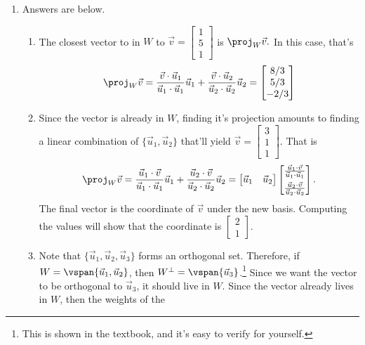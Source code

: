 \begin{enumerate}
		\item Answers are below.
			\begin{enumerate}
				\item The closest vector to in \(W\) to \(\vec{v} = \begin{bmatrix}1 \\ 5 \\ 1\end{bmatrix}\) is \(\proj_W \vec{v}.\)
				In this case, that's 
				\[\proj_W \vec{v}
				  = \frac{\vec{v} \cdot \vec{u}_1}{\vec{u}_1 \cdot \vec{u}_1}\vec{u}_1 
				   + \frac{\vec{v} \cdot \vec{u}_2}{\vec{u}_2 \cdot \vec{u}_2}\vec{u}_2 = \begin{bmatrix}8/3 \\ 5/3 \\ -2/3\end{bmatrix}\]
				\item Since the vector is already in \(W\), finding it's projection amounts to finding a linear combination of \(\{\vec{u}_1, \vec{u}_2\}\)
					that'll yield \(\vec{v} = \begin{bmatrix}3 \\ 1 \\ 1\end{bmatrix}\). That is 
					\[\proj_W \vec{v} = \frac{\vec{u}_1 \cdot \vec{v}}{\vec{u}_1 \cdot \vec{u}_1}\vec{u}_1 + \frac{\vec{u}_2 \cdot \vec{v}}{\vec{u}_2 \cdot \vec{u}_2}\vec{u}_2 = \begin{bmatrix}\vec{u}_1 & \vec{u}_2\end{bmatrix}\begin{bmatrix}\frac{\vec{u}_1 \cdot \vec{v}}{\vec{u}_1 \cdot \vec{u}_1}\\[0.5em] \frac{\vec{u}_2 \cdot \vec{v}}{\vec{u}_2 \cdot \vec{u}_2}\end{bmatrix}.\] The final vector is the coordinate of \(\vec{v}\) under the new basis. 
					Computing the values will show that the coordinate is \(\begin{bmatrix}2 \\ 1\end{bmatrix}\).
				\item Note that \(\{\vec{u}_1, \vec{u}_2, \vec{u}_3\}\) forms an orthogonal set. Therefore, if \(W =  \vspan\{\vec{u}_1, \vec{u}_2\}\),
					 then \(W^\perp = \vspan\{\vec{u}_3\}\).\footnote{This is shown in the textbook, and it's easy to verify for yourself.} Since we want
					 the vector to be orthogonal to \(\vec{u}_3\), it should live in \(W\). Since the vector already lives in \(W\), then the weights of the 

\end{enumerate}
\end{enumerate}
